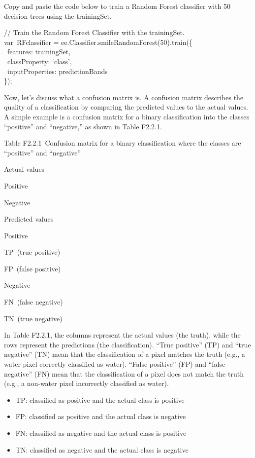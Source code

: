 \documentclass[
  letterpaper,
  DIV=11,
  numbers=noendperiod]{scrreprt}
\providecommand{\tightlist}{%
  \setlength{\itemsep}{0pt}\setlength{\parskip}{0pt}}\usepackage{longtable,booktabs,array}
\begin{document}
Copy and paste the code below to train a Random Forest classifier with
50 decision trees using the trainingSet.

// Train the Random Forest Classifier with the trainingSet.\\
var~RFclassifier = ee.Classifier.smileRandomForest(50).train(\{\\
\hspace*{0.333em} ~features: trainingSet,\\
\hspace*{0.333em} ~classProperty: `class',\\
\hspace*{0.333em} ~inputProperties: predictionBands\\
\});

Now, let's discuss what a confusion matrix is. A confusion matrix
describes the quality of a classification by comparing the predicted
values to the actual values. A simple example is a confusion matrix for
a binary classification into the classes ``positive'' and ``negative,''
as shown in Table F2.2.1.

Table F2.2.1~Confusion matrix for a binary classification where the
classes are ``positive'' and ``negative''

Actual values

Positive

Negative

Predicted values

Positive

TP~(true positive)

FP~(false positive)

Negative

FN~(false negative)

TN~(true negative)

In Table F2.2.1, the columns represent the actual values (the truth),
while the rows represent the predictions (the classification). ``True
positive'' (TP) and ``true negative'' (TN) mean that the classification
of a pixel matches the truth (e.g., a water pixel correctly classified
as water). ``False positive'' (FP) and ``false negative'' (FN) mean that
the classification of a pixel does not match the truth (e.g., a
non-water pixel incorrectly classified as water).

\begin{itemize}
\tightlist
\item
  TP: classified as positive and the actual class is positive
\item
  FP: classified as positive and the actual class is negative
\item
  FN: classified as negative and the actual class is positive
\item
  TN: classified as negative and the actual class is negative
\end{itemize}
\end{document}
